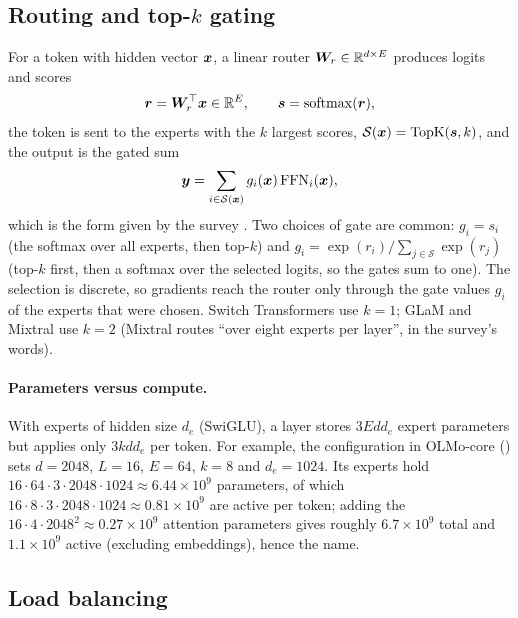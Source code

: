 \subsection{Routing and \texorpdfstring{top-$k$}{top-k} gating}\label{sec:c01-router}

For a token with hidden vector $\bm{x}$, a linear router $\bm{W}_r \in \mathbb{R}^{d\times E}$ produces
logits and scores
\begin{equation}\label{eq:c01-router}
  \bm{r} = \bm{W}_r^{\top}\bm{x} \in \mathbb{R}^{E},\qquad \bm{s} = \operatorname{softmax}(\bm{r}),
\end{equation}
the token is sent to the experts with the $k$ largest scores, $\mathcal{S}(\bm{x}) =
\operatorname{TopK}(\bm{s}, k)$, and the output is the gated sum
\begin{equation}\label{eq:c01-moe}
  \bm{y} = \sum_{i \in \mathcal{S}(\bm{x})} g_i(\bm{x})\,\mathrm{FFN}_i(\bm{x}),
\end{equation}
which is the form given by the survey \citep{zhoubian2026memory}. Two choices of gate are
common: $g_i = s_i$ (the softmax over all experts, then top-$k$) and $g_i = \exp(r_i) /
\sum_{j\in\mathcal{S}}\exp(r_j)$ (top-$k$ first, then a softmax over the selected logits,
so the gates sum to one). The selection is discrete, so gradients reach the router only
through the gate values $g_i$ of the experts that were chosen. Switch Transformers
\citep{fedus2022switch} use $k = 1$; GLaM \citep{du2022glam} and Mixtral
\citep{jiang2024mixtral} use $k = 2$ (Mixtral routes ``over eight experts per layer'', in
the survey's words).

\paragraph{Parameters versus compute.} With experts of hidden size $d_e$ (SwiGLU), a layer
stores $3Edd_e$ expert parameters but applies only $3kdd_e$ per token. For example, the
 configuration in OLMo-core
() sets
$d = 2048$, $L = 16$, $E = 64$, $k = 8$ and $d_e = 1024$. Its experts hold
$16\cdot 64\cdot 3\cdot 2048\cdot 1024 \approx 6.44\times 10^9$ parameters, of which
$16\cdot 8\cdot 3\cdot 2048\cdot 1024 \approx 0.81\times 10^9$ are active per token; adding
the $16\cdot 4\cdot 2048^2 \approx 0.27\times 10^9$ attention parameters gives roughly
$6.7\times 10^9$ total and $1.1\times 10^9$ active (excluding embeddings), hence the name.

\subsection{Load balancing}\label{sec:c01-load-balance}

